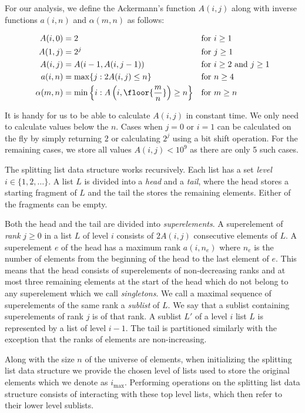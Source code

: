 For our analysis, we define the Ackermann's function $A(i,j)$ along with inverse functions $a(i,n)$ and $\alpha(m, n)$ as follows:

\begin{align*}
    A(i,0) &= 2 &&\text{for $i \geq 1$} \\
    A(1,j) &= 2^j &&\text{for $j \geq 1$} \\
    A(i,j) &= A(i-1,A(i, j-1)) &&\text{for $i \geq 2$ and $j \geq 1$} \\
    a(i,n) &= \max \{ j: 2A(i,j) \leq n \} &&\text{for $n \geq 4$} \\
    \alpha(m,n) &= \min \left\{ i: A\left(i,\floor{\frac{m}{n}}\right) \geq n \right\} &&\text{for $m \geq n$}
\end{align*}

It is handy for us to be able to calculate $A(i,j)$ in constant time. We only need to calculate values below the $n$. Cases when $j = 0$ or $i = 1$ can be calculated on the fly by simply returning $2$ or calculating $2^j$ using a bit shift operation. For the remaining cases, we store all values $A(i,j) < 10^9$ as there are only 5 such cases.

The splitting list data structure works recursively. Each list has a set \textit{level} $i \in \{1, 2, \dots \}$. A list $L$ is divided into a \textit{head} and a \textit{tail}, where the head stores a starting fragment of $L$ and the tail the stores the remaining elements. Either of the fragments can be empty. 

Both the head and the tail are divided into \textit{superelements}. A superelement of \textit{rank} $j \geq 0$ in a list $L$ of level $i$ consists of $2A(i,j)$ consecutive elements of $L$. A superelement $e$ of the head has a maximum rank $a(i, n_e)$ where $n_e$ is the number of elements from the beginning of the head to the last element of $e$. This means that the head consists of superelements of non-decreasing ranks and at most three remaining elements at the start of the head which do not belong to any superelement which we call \textit{singletons}. We call a maximal sequence of superelements of the same rank a \textit{sublist} of $L$. We say that a sublist containing superelements of rank $j$ is of that rank. A sublist $L'$ of a level $i$ list $L$ is represented by a list of level $i-1$. The tail is partitioned similarly with the exception that the ranks of elements are non-increasing. 

Along with the size $n$ of the universe of elements, when initializing the splitting list data structure we provide the chosen level of lists used to store the original elements which we denote as $i_{\max}$. Performing operations on the splitting list data structure consists of interacting with these top level lists, which then refer to their lower level sublists.

